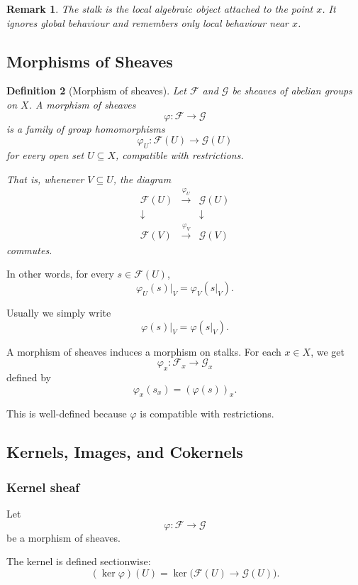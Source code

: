 \documentclass[12pt,a4paper]{article}
\newcommand{\F}{\mathcal F}
\newcommand{\G}{\mathcal G}
\theoremstyle{notespace}
\newtheorem{definition}{Definition}[subsection]
\newtheorem{remark}[definition]{Remark}
\begin{document}
\begin{remark}
	The stalk is the local algebraic object attached to the point \(x\). It ignores global behaviour and remembers only local behaviour near \(x\).
\end{remark}

\subsection{Morphisms of Sheaves}

\begin{definition}[Morphism of sheaves]
	Let \(\F\) and \(\G\) be sheaves of abelian groups on \(X\). A morphism of sheaves
	\[
	\varphi:\F\longrightarrow \G
	\]
	is a family of group homomorphisms
	\[
	\varphi_U:\F(U)\longrightarrow \G(U)
	\]
	for every open set \(U\subseteq X\), compatible with restrictions.
	
	That is, whenever \(V\subseteq U\), the diagram
	\[
	\begin{array}{ccc}
		\F(U) & \xrightarrow{\varphi_U} & \G(U) \\
		\downarrow & & \downarrow \\
		\F(V) & \xrightarrow{\varphi_V} & \G(V)
	\end{array}
	\]
	commutes.
\end{definition}

In other words, for every \(s\in \F(U)\),
\[
\varphi_U(s)|_V=\varphi_V(s|_V).
\]

Usually we simply write
\[
\varphi(s)|_V=\varphi(s|_V).
\]

A morphism of sheaves induces a morphism on stalks. For each \(x\in X\), we get
\[
\varphi_x:\F_x\longrightarrow \G_x
\]
defined by
\[
\varphi_x(s_x)=(\varphi(s))_x.
\]

This is well-defined because \(\varphi\) is compatible with restrictions.

\subsection{Kernels, Images, and Cokernels}

\subsubsection{Kernel sheaf}

Let
\[
\varphi:\F\to \G
\]
be a morphism of sheaves.

The kernel is defined sectionwise:
\[
(\ker\varphi)(U)=\ker\bigl(\F(U)\to \G(U)\bigr).
\]
\end{document}

